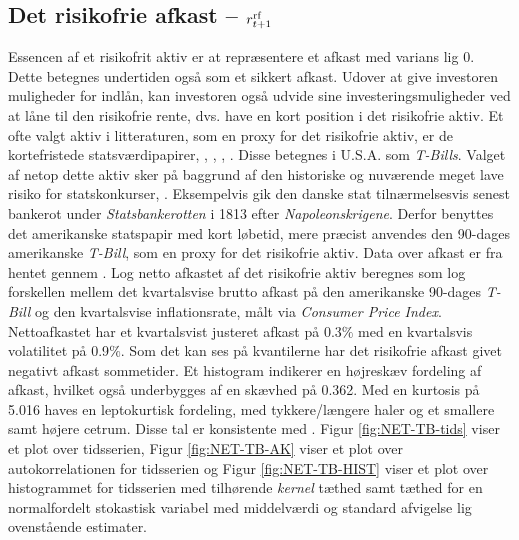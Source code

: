 \documentclass[
  a4paper,
  oneside]{memoir}
\begin{document}
\hypertarget{det-risikofrie-afkast-r_t1textnormalrf}{%
\subsection{\texorpdfstring{Det risikofrie afkast -- \(r_{t+1}^{\textnormal{rf}}\)}{Det risikofrie afkast -- r\_\{t+1\}\^{}\{\textbackslash textnormal\{rf\}\}}}\label{det-risikofrie-afkast-r_t1textnormalrf}}

Essencen af et risikofrit aktiv er at repræsentere et afkast med varians lig \(0\). Dette betegnes undertiden også som et sikkert afkast. Udover at give investoren muligheder for indlån, kan investoren også udvide sine investeringsmuligheder ved at låne til den risikofrie rente, dvs. have en kort position i det risikofrie aktiv. Et ofte valgt aktiv i litteraturen, som en proxy for det risikofrie aktiv, er de kortefristede statsværdipapirer, \citep{CampVic2003, CampVic1999}, \citep{JurVic2011}, \citep{Engsted2012}, \citep{CampVicCha2003}. Disse betegnes i U.S.A. som \emph{T-Bills}. Valget af netop dette aktiv sker på baggrund af den historiske og nuværende meget lave risiko for statskonkurser, \citep{Beers2017}. Eksempelvis gik den danske stat tilnærmelsesvis senest bankerot under \emph{Statsbankerotten} i 1813 efter \emph{Napoleonskrigene}. Derfor benyttes det amerikanske statspapir med kort løbetid, mere præcist anvendes den 90-dages amerikanske \emph{T-Bill}, som en proxy for det risikofrie aktiv. Data over afkast er fra \citep{CRSPt90} hentet gennem \citep{WRDSt90}. Log netto afkastet af det risikofrie aktiv beregnes som log forskellen mellem det kvartalsvise brutto afkast på den amerikanske 90-dages \emph{T-Bill} og den kvartalsvise inflationsrate, målt via \emph{Consumer Price Index}. Nettoafkastet har et kvartalsvist justeret afkast på 0.3\(\%\) med en kvartalsvis volatilitet på 0.9\(\%\). Som det kan ses på kvantilerne har det risikofrie afkast givet negativt afkast sommetider. Et histogram indikerer en højreskæv fordeling af afkast, hvilket også underbygges af en skævhed på 0.362. Med en kurtosis på 5.016 haves en leptokurtisk fordeling, med tykkere/længere haler og et smallere samt højere cetrum. Disse tal er konsistente med \citep{CampVic2003}. Figur \ref{fig:NET-TB-tids} viser et plot over tidsserien, Figur \ref{fig:NET-TB-AK} viser et plot over autokorrelationen for tidsserien og Figur \ref{fig:NET-TB-HIST} viser et plot over histogrammet for tidsserien med tilhørende \emph{kernel} tæthed samt tæthed for en normalfordelt stokastisk variabel med middelværdi og standard afvigelse lig ovenstående estimater.
\end{document}
